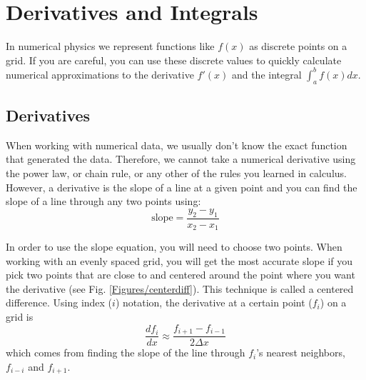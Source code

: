 \chapter{Derivatives and Integrals}

\label{chap:Calculus}


In numerical physics we represent functions like $f(x)$ as discrete points on
a grid.  If you are careful, you can use these discrete values to quickly
calculate numerical approximations to the derivative $f'(x)$ and the integral
$\int_a^b f(x) dx$.

\medskip

\section{Derivatives}

When working with numerical data, we usually don't know the exact function that generated the data.  Therefore, we cannot take a numerical derivative using the power law, or chain rule, or any other of the rules you learned in calculus.  However, a derivative is the slope of a line at a given point and you can find the slope of a line through any two points using:
\begin{equation}
\text{slope} = \frac{y_2-y_1}{x_2-x_1}
\end{equation}


In order to use the slope equation, you will need to choose two points.  When working with an evenly spaced grid, you will get the most accurate slope if you pick two points that are close to and centered around the point where you want the derivative (see Fig. \ref{Figures/centerdiff}). This technique is called a centered difference. Using index ($i$) notation, the derivative at a certain point ($f_i$) on a grid is
\begin{equation}
\frac{d f_i}{dx} \approx \frac{f_{i+1}-f_{i-1}}{2 \Delta x}
\end{equation}
which comes from finding the slope of the line through $f_i$'s nearest neighbors, $f_{i-i}$ and $f_{i+1}$.


